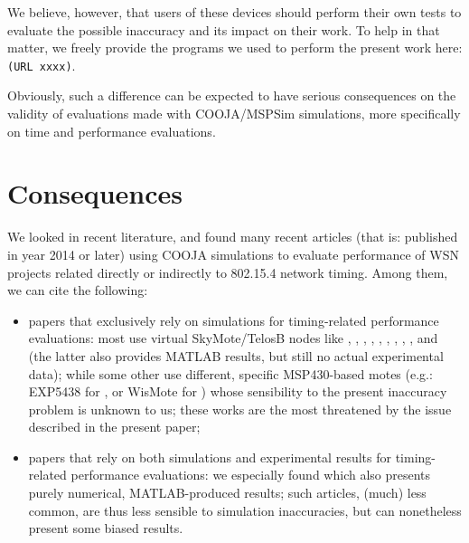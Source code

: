 \documentclass[a4paper,10pt]{article}
\begin{document}
We believe, however, that users of these devices should perform their
own tests to evaluate the possible inaccuracy and its impact on their work.
To help in that matter, we freely provide the programs we used to perform the
present work here:\\
\texttt{(URL xxxx)}.

Obviously, such a difference can be expected to have serious consequences
on the validity of evaluations made with COOJA/MSPSim simulations,
more specifically on time and performance evaluations.


\section{Consequences}
\label{consequences}

We looked in recent literature, and found many recent articles (that is:
published in year 2014 or later) using COOJA simulations to evaluate
performance of WSN projects related directly or indirectly to 802.15.4
network timing. Among them, we can cite the following:
\begin{itemize}
\item papers that exclusively rely on simulations for timing-related
performance evaluations: most use virtual SkyMote/TelosB nodes like
\cite{Constrain-Routing-Trees-2014}, \cite{Contiki-RPL-Eval-2014},
\cite{Co-RPL-2014}, \cite{DINAS-2014},
\cite{Efficient-Distrib-Svc-Discovery-2014},
\cite{IETF-Routing-WSN-2014},
\cite{TinySDN-2014}, \cite{Trickle-L2-2014},
\cite{Visual-Sensor-Networks-2014},
and \cite{RPL-GreenHouse-Convgc-Time-2014} (the latter also provides
MATLAB results, but still no actual experimental data);
while some other use different, specific MSP430-based motes
(e.g.: EXP5438 for \cite{Key-Mgmt-2015}, or WisMote for
\cite{Lightweight-Multicast-Forwarding-2014}) whose sensibility
to the present inaccuracy problem is unknown to us;
these works are the most threatened by the issue described
in the present paper;
\item papers that rely on both simulations and experimental results
for timing-related performance evaluations: we especially found
\cite{Probing-Mech-wu-2015} which also presents purely numerical,
MATLAB-produced results; such articles, (much) less common, are thus
less sensible to simulation inaccuracies, but can nonetheless present
some biased results.
\end{itemize}
\end{document}
